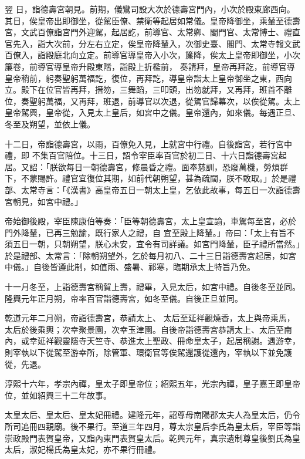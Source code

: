 \begin{pinyinscope}
 翌
 日，詣德壽宮朝見。前期，儀鸞司設大次於德壽宮門內，小次於殿東廊西向。其日，俟皇帝出即御坐，從駕臣僚、禁衛等起居如常儀。皇帝降御坐，乘輦至德壽宮，文武百僚詣宮門外迎駕，起居訖，前導官、太常卿、閣門官、太常博士、禮直官先入，詣大次前，分左右立定，俟皇帝降輦入，次御史臺、閣門、太常寺報文武百僚入，詣殿庭北向立定。前導官導皇帝入小次，簾降，俟太上皇帝即御坐，小次簾卷，前導官導皇帝升殿東階，詣殿上折檻前，
 奏請拜，皇帝再拜訖，前導官導皇帝稍前，躬奏聖躬萬福訖，復位，再拜訖，導皇帝詣太上皇帝御坐之東，西向立。殿下在位官皆再拜，搢笏，三舞蹈，三叩頭，出笏就拜，又再拜，班首不離位，奏聖躬萬福，又再拜，班退，前導官以次退，從駕官歸幕次，以俟從駕。太上皇帝駕興，皇帝從，入見太上皇后，如宮中之儀。皇帝還內，如來儀。每遇正旦、冬至及朔望，並依上儀。



 十二日，帝詣德壽宮，以雨，百僚免入見，上就宮中行禮。自後詣宮，若行宮中禮，即
 不集百官陪位。十三日，詔令宰臣率百官於初二日、十六日詣德壽宮起居。又詔：「朕欲每日一朝德壽宮，修晨昏之禮。面奉慈訓，恐廢萬機，勞煩群下，不蒙賜許。禮官宜復位其期，如前代朝朔望，甚為疏闊，朕不敢取。」於是禮部、太常寺言：「《漢書》高皇帝五日一朝太上皇，乞依此故事，每五日一次詣德壽宮朝見，如宮中禮。」



 帝始御後殿，宰臣陳康伯等奏：「臣等朝德壽宮，太上皇宣諭，車駕每至宮，必於門外降輦，已再三勉諭，既行家人之禮，自
 宜至殿上降輦。」帝曰：「太上有旨不須五日一朝，只朝朔望，朕心未安，宜令有司詳議。如宮門降輦，臣子禮所當然。」於是禮部、太常言：「除朝朔望外，乞於每月初八、二十三日詣德壽宮起居，如宮中儀。」自後皆遵此制，如值雨、盛暑、祁寒，臨期承太上特旨乃免。



 十一月冬至，上詣德壽宮稱賀上壽，禮畢，入見太后，如宮中禮。自後冬至並同。隆興元年正月朔，帝率百官詣德壽宮，如冬至儀。自後正旦並同。



 乾道元年二月朔，帝詣德壽宮，恭請太上、
 太后至延祥觀燒香，太上與帝乘馬，太后於後乘輿；次幸聚景園，次幸玉津園。自後帝詣德壽宮恭請太上、太后至南內，或幸延祥觀靈隱寺天竺寺、恭進太上聖政、冊命皇太子，起居稱謝。遇游幸，則宰執以下從駕至游幸所，除管軍、環衛官等俟駕還護從還內，宰執以下並免護從，先退。



 淳熙十六年，孝宗內禪，皇太子即皇帝位；紹熙五年，光宗內禪，皇子嘉王即皇帝位，並如紹興三十二年故事。



 太皇太后、皇太后、皇太妃冊禮。建隆元年，詔尊母南陽郡太夫人為皇太后，仍令所司追冊四親廟。後不果行。至道三年四月，尊太宗皇后李氏為皇太后，宰臣等詣崇政殿門表賀皇帝，又詣內東門表賀皇太后。乾興元年，真宗遺制尊皇後劉氏為皇太后，淑妃楊氏為皇太妃，亦不果行冊禮。




\end{pinyinscope}
